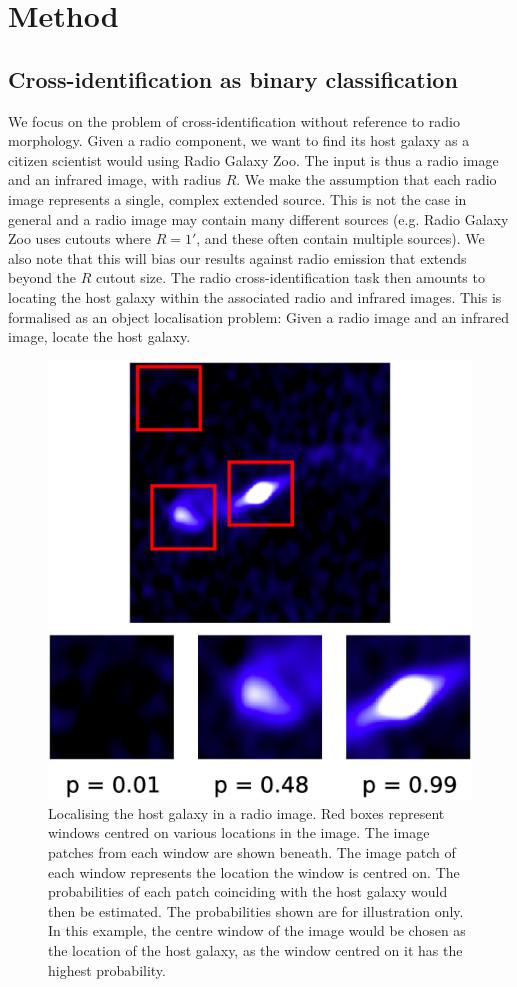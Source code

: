 \documentclass[fleqn,usenatbib,usedcolumn]{mnras}
\begin{document}
  \section{Method}\label{method}

  \subsection{Cross-identification as binary
  classification}\label{cross-identification-as-binary-classification}

    We focus on the problem of cross-identification without reference to radio
    morphology. Given a radio component, we want to find its host galaxy as a
    citizen scientist would using Radio Galaxy Zoo. The input is thus a radio
    image and an infrared image, with radius \(R\). We make the assumption
    that each radio image represents a single, complex extended source. This
    is not the case in general and a radio image may contain many different
    sources (e.g. Radio Galaxy Zoo uses cutouts where \(R = 1'\), and these
    often contain multiple sources). We also note that this will bias our
    results against radio emission that extends beyond the \(R\) cutout size.
    The radio cross-identification task then amounts to locating the host
    galaxy within the associated radio and infrared images. This is formalised
    as an object localisation problem: Given a radio image and an infrared
    image, locate the host galaxy.

    \begin{figure}
      \centering
      \includegraphics[trim={5cm 0cm 4cm 5cm}, width=0.5\linewidth]{images/windows.eps}
      \caption{Localising the host galaxy in a radio image. Red boxes
        represent windows centred on various locations in the image. The image
        patches from each window are shown beneath. The image patch of each
        window represents the location the window is centred on. The
        probabilities of each patch coinciding with the host galaxy would then
        be estimated. The probabilities shown are for illustration only. In
        this example, the centre window of the image would be chosen as the
        location of the host galaxy, as the window centred on it has the
        highest probability.}
      \label{fig:windows}
    \end{figure}
\end{document}
